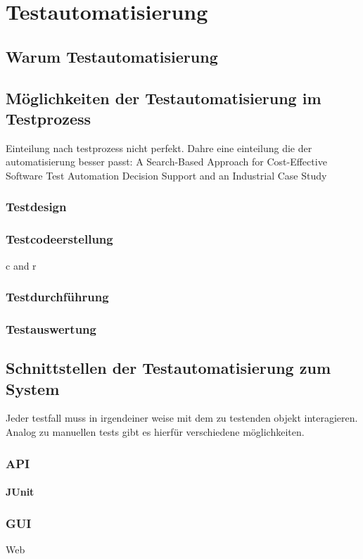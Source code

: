 \chapter{Testautomatisierung}
\label{sec:testautomatisierung}


\section{Warum Testautomatisierung}
\label{sec:warum_testautomatisierung}



\section{Möglichkeiten der Testautomatisierung im Testprozess}
\label{sec:bereiche_der_estautomatisierung}
Einteilung nach testprozess nicht perfekt. Dahre eine einteilung die der automatisierung besser passt:
A Search-Based Approach for Cost-Effective Software Test Automation Decision Support and an Industrial Case Study

\subsection{Testdesign}
\label{subsec:testdesign}


\subsection{Testcodeerstellung}
\label{subsec:testcodeerstellung}
c and r

\subsection{Testdurchführung}
\label{subsec:testdurchführung}


\subsection{Testauswertung}
\label{subsec:testauswertung}



\section{Schnittstellen der Testautomatisierung zum System}
\label{sec:schnittstellen_der_testautomatisierung_zum_syste}

Jeder testfall muss in irgendeiner weise mit dem zu testenden objekt interagieren.
Analog zu manuellen tests gibt es hierfür verschiedene möglichkeiten.
\subsection{API}
\subsubsection{JUnit}
\label{sec:junit}

\subsection{GUI}
Web
